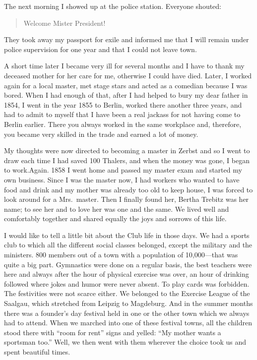 \documentclass{article}
\begin{document}
The next morning I showed up at the police station. Everyone shouted:

\begin{quote}
Welcome Mister President!
\end{quote}

They took away my passport for exile and informed me that I will remain under police supervision for one year and that I could not leave town.

A short time later I became very ill for several months and I have to thank my deceased mother for her care for me, otherwise I could have died. Later, I worked again for a local master, met stage stars and acted as a comedian because I was bored. When I had enough of that, after I had helped to bury my dear father in 1854, I went in the year 1855 to Berlin, worked there another three years, and had to admit to myself that I have been a real jackass for not having come to Berlin earlier. There you always worked in the same workplace and, therefore, you became very skilled in the trade and earned a lot of money.

My thoughts were now directed to becoming a master in Zerbst and so I went to draw each time I had saved 100 Thalers, and when the money was gone, I began to work.Again. 1858 I went home and passed my master exam and started my own business. Since I was the master now, I had workers who wanted to have food and drink and my mother was already too old to keep house, I was forced to look around for a Mrs.~master. Then I finally found her, Bertha Trebitz was her name; to see her and to love her was one and the same. We lived well and comfortably together and shared equally the joys and sorrows of this life.

I would like to tell a little bit about the Club life in those days. We had a sports club to which all the different social classes belonged, except the military and the ministers. 800 members out of a town with a population of 10,000---that was quite a big part. Gymnastics were done on a regular basis, the best teachers were here and always after the hour of physical exercise was over, an hour of drinking followed where jokes and humor were never absent. To play cards was forbidden. The festivities were not scarce either. We belonged to the Exercise League of the Saalgau, which stretched from Leipzig to Magdeburg. And in the summer months there was a founder's day festival held in one or the other town which we always had to attend. When we marched into one of these festival towns, all the children stood there with ``room for rent'' signs and yelled: ``My mother wants a sportsman too.'' Well, we then went with them wherever the choice took us and spent beautiful times.
\end{document}
